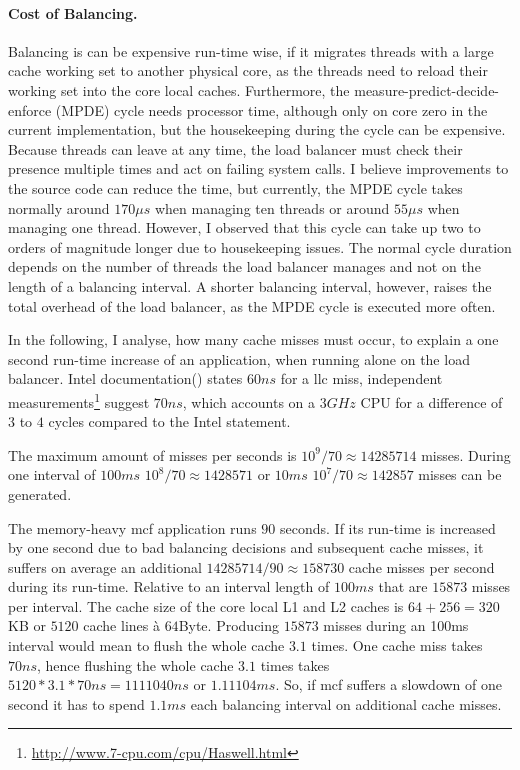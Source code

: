 \paragraph{Cost of Balancing.}
Balancing is can be expensive run-time wise, if it migrates threads with a
large cache working set to another physical core, as the threads need to reload
their working set into the core local caches.
Furthermore, the measure-predict-decide-enforce (MPDE) cycle needs processor time,
although only on core zero in the current implementation, but the housekeeping
during the cycle can be expensive.
Because threads can leave at any time, the load balancer must check their
presence multiple times and act on failing system calls.
I believe improvements to the source code can reduce the time, but currently,
the MPDE cycle takes normally around $170\mu{}s$ when managing ten threads or around
$55\mu{}s$ when managing one thread.
However, I observed that this cycle can take up two to orders of magnitude
longer due to housekeeping issues.
The normal cycle duration depends on the number of threads the load
balancer manages and not on the length of a balancing interval.
A shorter balancing interval, however, raises the total overhead of the load
balancer, as the MPDE cycle is executed more often.

In the following, I analyse, how many cache misses must occur, to explain a one
second run-time increase of an application, when running alone on the load
balancer.
Intel documentation(\cite{intel_perf_analysis_2009}) states $60ns$ for a
\gls{llc} miss, independent
measurements\footnote{\url{http://www.7-cpu.com/cpu/Haswell.html}}
suggest $70ns$, which accounts on a $3\textit{GHz}$ CPU for a difference of $3$ to $4$ cycles
compared to the Intel statement.

The maximum amount of misses per seconds is $10^9/70 \approx 14285714$ misses.
During one interval of $100ms$ $10^8/70 \approx 1428571$ or $10ms$ $10^7/70 \approx
142857$ misses can be generated.

The memory-heavy mcf application runs $90$ seconds.
If its run-time is increased by one second due to bad balancing decisions and
subsequent cache misses, it suffers on average an additional
$14285714 / 90 \approx 158730$ cache misses per second during its run-time.
Relative to an interval length of $100ms$ that are $15873$ misses per interval.
The cache size of the core local L1 and L2 caches is $64 + 256 = 320$KB or
$5120$ cache lines \`a $64$Byte.
Producing $15873$ misses during an 100ms interval would mean to flush the
whole cache $3.1$ times.
One cache miss takes $70ns$, hence flushing the whole cache $3.1$ times takes
$5120 * 3.1 * 70ns = 1111040ns$ or $1.11104ms$.
So, if mcf suffers a slowdown of one second it has to spend $1.1ms$ each balancing
interval on additional cache misses.

